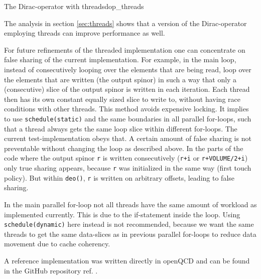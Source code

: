 \documentclass{article}
\theoremstyle{plain} %
\theoremstyle{convention} %
\theoremstyle{remark} %
\def\code#1{\texttt{#1}}
\numberwithin{equation}{section}
\begin{document}
\begin{proposal}{The Dirac-operator with threads}{dop_threads}

The analysis in section \ref{sec:threads} shows that a version of the Dirac-operator employing threads can improve performance as well.

For future refinements of the threaded implementation one can concentrate on false sharing of the current implementation. For example, in the main loop, instead of consecutively looping over the elements that are being read, loop over the elements that are written (the output spinor) in such a way that only a (consecutive) slice of the output spinor is written in each iteration. Each thread then has its own constant equally sized slice to write to, without having race conditions with other threads. This method avoids expensive locking. It implies to use \code{schedule(static)} and the same boundaries in all parallel for-loops, such that a thread always gets the same loop slice within different for-loops. The current test-implementation obeys that. A certain amount of false sharing is not preventable without changing the loop as described above. In the parts of the code where the output spinor \code{r} is written consecutively (\code{r+i} or \code{r+VOLUME/2+i}) only true sharing appears, because \code{r} was initialized in the same way (first touch policy). But within \code{deo()}, \code{r} is written on arbitrary offsets, leading to false sharing.

In the main parallel for-loop not all threads have the same amount of workload as implemented currently. This is due to the if-statement inside the loop. Using \code{schedule(dynamic)} here instead is not recommended, because we want the same threads to get the same data-slices as in previous parallel for-loops to reduce data movement due to cache coherency.

A reference implementation was written directly in openQCD and can be found in the GitHub repository ref. \cite{openqcd_threads}.

\end{proposal}
\end{document}
